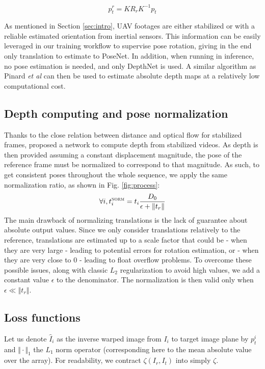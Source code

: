 \documentclass[runningheads]{llncs}
\def\etal{\emph{et al}\:}
\begin{document}
\begin{equation}
\label{eq:stab}
p^r_t=KR_rK^{-1}p_t
\end{equation}

As mentioned in Section \ref{sec:intro}, UAV footages are either stabilized or with a reliable estimated orientation from inertial sensors. This information can be easily leveraged in our training workflow to supervise pose rotation, giving in the end only translation to estimate to PoseNet. In addition, when running in inference, no pose estimation is needed, and only DepthNet is used. A similar algorithm as Pinard \etal \cite{pinard:hal-01587658} can then be used to estimate absolute depth maps at a relatively low computational cost.

\subsection{Depth computing and pose normalization}
Thanks to the close relation between distance and optical flow for stabilized frames, \cite{isprs-annals-IV-2-W3-67-2017} proposed a network to compute depth from stabilized videos.
As depth is then provided assuming a constant displacement magnitude, the pose of the reference frame must be normalized to correspond to that magnitude.
As such, to get consistent poses throughout the whole sequence, we apply the same normalization ratio, as shown in Fig. \ref{fig:process}:
\begin{equation}
\forall i, t_i^{\textsc{norm}} = t_i\frac{D_0}{\epsilon + \Vert t_r\Vert}
\end{equation}
The main drawback of normalizing translations is the lack of guarantee about absolute output values. Since we only consider translations relatively to the reference, translations are estimated up to a scale factor that could be - when they are very large - leading to potential errors for rotation estimation, or - when they are very close to $0$ - leading to float overflow problems. To overcome these possible issues, along with classic $L_2$ regularization to avoid high values, we add a constant value $\epsilon$ to the denominator. The normalization is then valid only when
$\epsilon \ll \left\Vert t_r \right\Vert$.

\subsection{Loss functions}
 Let us denote $\widehat{I}_i$ as the inverse warped image from $I_i$ to target image plane by $p^i_t$ and $\Vert\cdot\Vert_1$
the $L_1$ norm operator (corresponding here to the mean absolute value over the array).
For readability, we contract $\zeta(I_r, I_t)$ into simply $\zeta$.
\end{document}
